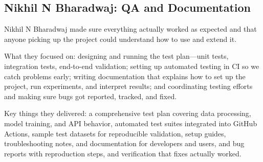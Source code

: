 \subsection{Nikhil N Bharadwaj: QA and Documentation}
Nikhil N Bharadwaj made sure everything actually worked as expected and that anyone picking up the project could understand how to use and extend it.

What they focused on: designing and running the test plan—unit tests, integration tests, end-to-end validation; setting up automated testing in CI so we catch problems early; writing documentation that explains how to set up the project, run experiments, and interpret results; and coordinating testing efforts and making sure bugs got reported, tracked, and fixed.

Key things they delivered: a comprehensive test plan covering data processing, model training, and API behavior, automated test suites integrated into GitHub Actions, sample test datasets for reproducible validation, setup guides, troubleshooting notes, and documentation for developers and users, and bug reports with reproduction steps, and verification that fixes actually worked.
